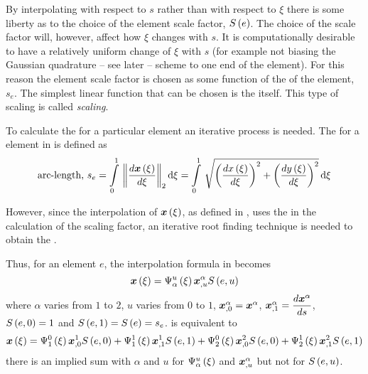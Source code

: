 By interpolating with respect to $s$ rather than with respect to $\xi$ there is some
liberty as to the choice of the element scale factor, $   S \left( {e} \right)  $. The choice
of the scale factor will, however, affect how $\xi$ changes with $s$.  It is
computationally desirable to have a relatively uniform change of $\xi$ with
$s$ (for example not biasing the Gaussian quadrature -- see later -- scheme to
one end of the element). For this reason the element scale factor is chosen as
some function of the \arclen of the element, $s_{e}$. The simplest linear
function that can be chosen is the \arclen itself. This type of scaling is
called \emph{\arclen scaling}.

To calculate the \arclen for a particular element an iterative process is
needed. The \arclen for a \onedal element in \twods is defined as
\begin{equation}
  \text{\arclen, }s_{e}=\gint{0}{1}{\norm{\dby{\fnof{\vect{x}}{\xi}}{\xi}}}
  {\xi}=\gint{0}{1}{\sqrt{\pbrac{\dby{\fnof{x}{\xi}}{\xi}}^{2}+
      \pbrac{\dby{\fnof{y}{\xi}}{\xi}}^{2}}}{\xi}
  \label{eqn:arclendef}
\end{equation}

However, since the interpolation of $\fnof{\vect{x}}{\xi}$, as defined in
, uses the \arclen in the calculation of the
scaling factor, an iterative root finding technique is needed to obtain the
\arclen.

Thus, for an element $e$, the \onedal \cubicherm interpolation
formula in  becomes
\begin{equation}
  \fnof{\vect{x}}{\xi}=\chbfn{\alpha}{u}{\xi}\nodept{\vect{x}}{\alpha}_{,u}
  \esftwo{e}{u}
  \label{eqn:chsfinterpolation}
\end{equation}
where $\alpha$ varies from $1$ to $2$, $u$ varies from $0$ to $1$,
$\nodept{\vect{x}}{\alpha}_{,0}=\nodept{\vect{x}}{\alpha}$,
$\nodept{\vect{x}}{\alpha}_{,1}= \dby{\nodept{\vect{x}}{\alpha}}{s}$,
$   S \left( e,0 \right)  =1$ and $   S \left( e,1 \right)  =   S \left( {e} \right)  =s_{e}$.  is equivalent to
\begin{equation}
  \fnof{\vect{x}}{\xi}=\chbfn{1}{0}{\xi}\nodept{\vect{x}}{1}_{,0}\esftwo{e}{0}
  +\chbfn{1}{1}{\xi}\nodept{\vect{x}}{1}_{,1}\esftwo{e}{1}+
  \chbfn{2}{0}{\xi}\nodept{\vect{x}}{2}_{,0}\esftwo{e}{0}
  +\chbfn{2}{1}{\xi}\nodept{\vect{x}}{2}_{,1}\esftwo{e}{1}
\end{equation}
\ie there is an implied sum with $\alpha$ and $u$ for $   \Psi_{\alpha}^{u} \left( \xi \right)  $
and $\nodept{\vect{x}}{\alpha}_{,u}$ but not for $   S \left( e,u \right)  $.

